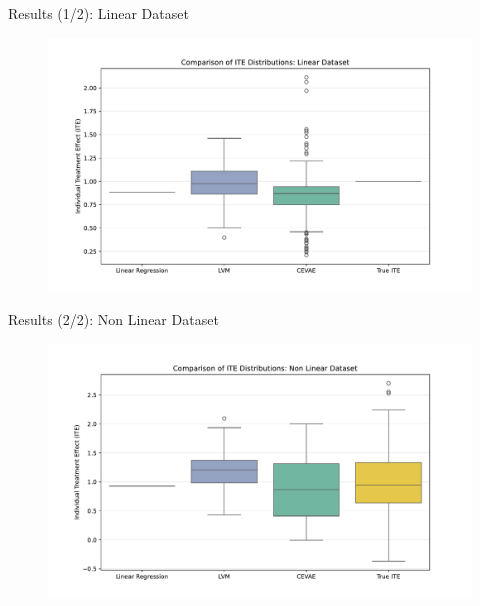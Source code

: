 \documentclass[10pt]{beamer}
\begin{document}
\begin{frame}{Results (1/2): Linear Dataset}
    \begin{figure}[H]
      \includegraphics[width=\textwidth]{images/boxplot_linear.pdf}
    \end{figure}
\end{frame}

\begin{frame}{Results (2/2): Non Linear Dataset}
    \begin{figure}[H]
      \includegraphics[width=\textwidth]{images/boxplot_non_linear.pdf}
    \end{figure}
\end{frame}
\end{document}
